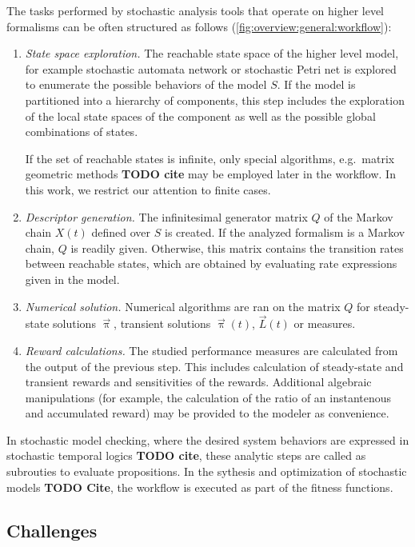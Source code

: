 The tasks performed by stochastic analysis tools that operate on
higher level formalisms can be often structured as follows
(\vref{fig:overview:general:workflow}):
\begin{enumerate}
\item \emph{State space exploration.} The reachable state space of the
  higher level model, for example stochastic automata network or
  stochastic Petri net is explored to enumerate the possible behaviors
  of the model $S$. If the model is partitioned into a hierarchy of
  components, this step includes the exploration of the local state
  spaces of the component as well as the possible global combinations
  of states.

  If the set of reachable states is infinite, only special algorithms,
  e.g.~matrix geometric methods \textbf{TODO cite} may be employed
  later in the workflow. In this work, we restrict our attention to
  finite cases.
\item \emph{Descriptor generation.} The infinitesimal generator matrix
  $Q$ of the Markov chain $X(t)$ defined over $S$ is created. If the
  analyzed formalism is a Markov chain, $Q$ is readily
  given. Otherwise, this matrix contains the transition rates between
  reachable states, which are obtained by evaluating rate expressions
  given in the model.
\item \emph{Numerical solution.} Numerical algorithms are ran on the
  matrix $Q$ for steady-state solutions $\vec{\uppi}$, transient
  solutions $\vec{\uppi}(t)$, $\vec{L}(t)$ or  measures.
\item \emph{Reward calculations.} The studied performance measures are
  calculated from the output of the previous step. This includes
  calculation of steady-state and transient rewards and sensitivities
  of the rewards. Additional algebraic manipulations (for example, the
  calculation of the ratio of an instantenous and accumulated reward)
  may be provided to the modeler as convenience.

\end{enumerate}

In stochastic model checking, where the desired system behaviors are
expressed in stochastic temporal logics \textbf{TODO cite}, these
analytic steps are called as subrouties to evaluate propositions. In
the sythesis and optimization of stochastic models \textbf{TODO Cite},
the workflow is executed as part of the fitness functions.

\subsection{Challenges}

